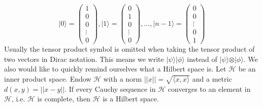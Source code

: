 \begin{equation}
\vert 0 \rangle = \begin{pmatrix}
1 \\
0 \\
0 \\
\vdots \\
0
\end{pmatrix}, \vert 1 \rangle = \begin{pmatrix}
0 \\
1 \\
0 \\
\vdots \\
0 
\end{pmatrix} , \dots , \vert n-1 \rangle = \begin{pmatrix}
0 \\
0 \\
\vdots \\
0 \\
1 
\end{pmatrix}
\end{equation}
Usually the tensor product symbol is omitted when taking the tensor product of two vectors in Dirac notation. This means we write $ \vert \psi \rangle \vert \phi \rangle$ instead of $ \vert \psi \rangle \otimes \vert \phi \rangle$. We also would like to quickly remind ourselves what a Hilbert space is. Let $\mathcal{H}$ be an inner product space. Endow $\mathcal{H}$ with a norm $\vert \vert x \vert \vert = \sqrt{\langle x,x \rangle}$ and a metric $d(x,y) = \vert \vert x-y \vert \vert$. If every Cauchy sequence in $\mathcal{H}$ converges to an element in $\mathcal{H}$, i.e. $\mathcal{H}$ is complete, then $\mathcal{H}$ is a Hilbert space. 
